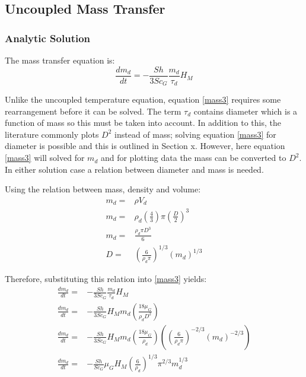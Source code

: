 \documentclass[../Interim_Report_Master]{subfiles}
\begin{document}
\newpage

\subsection{Uncoupled Mass Transfer}\label{sec:uc_mass}
\subsubsection{Analytic Solution}
The mass transfer equation is:
\begin{equation}
\frac{dm_d}{dt} = -\frac{Sh}{3Sc_G}\frac{m_d}{\tau_d}H_M
\label{mass3}
\end{equation}

Unlike the uncoupled temperature equation, equation \ref{mass3} requires some rearrangement before it can be solved. The term $\tau_d$ contains diameter which is a function of mass so this must be taken into account. In addition to this, the literature commonly plots $D^2$ instead of mass; solving equation \ref{mass3} for diameter is possible and this is outlined in Section x. However, here equation \ref{mass3} will solved for $m_d$ and for plotting data the mass can be converted to $D^2$. In either solution case a relation between diameter and mass is needed.

Using the relation between mass, density and volume:
\begin{subequations}
\begin{align}
m_d = & \rho V_d \\
m_d =& \rho_d \left(\frac{4}{3}\right) \pi \left(\frac{D}{2}\right)^3 \\
m_d =& \frac{\rho_d \pi D^3}{6} \\
D = & \left(\frac{6}{\rho_d \pi}\right)^{1/3} \left(m_d\right)^{1/3}
\end{align}
\end{subequations}
 
Therefore, substituting this relation into \ref{mass3} yields:
\begin{subequations}
\begin{align}
\frac{dm_d}{dt} =& -\frac{Sh}{3Sc_G}\frac{m_d}{\tau_d}H_M \\
\frac{dm_d}{dt} =& -\frac{Sh}{3Sc_G} H_M m_d\left(\frac{18\mu_G}{\rho_d D^2}\right)\\
\frac{dm_d}{dt} =& -\frac{Sh}{3Sc_G} H_M m_d\left(\frac{18\mu_G}{\rho_d}\right)\left(\left(\frac{6}{\rho_d \pi}\right)^{-2/3} \left(m_d\right)^{-2/3}\right) \\ 
\frac{dm_d}{dt} =& -\frac{Sh}{Sc_G}\mu_G H_M \left(\frac{6}{\rho_d}\right)^{1/3}\pi^{2/3} m_d^{1/3}
\end{align}
\end{subequations}
\end{document}
